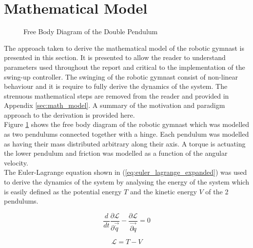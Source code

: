 \section{Mathematical Model}
\label{sec:mathematical_model}
\begin{figure}[h]
	\centering
	
	\caption{Free Body Diagram of the Double Pendulum}
	\label{fig:doublePen}
\end{figure}

The approach taken to derive the mathematical model of the robotic gymnast is presented in this section. It is presented to allow the reader to understand parameters used throughout the report and critical to the implementation of the swing-up controller. The swinging of the robotic gymnast consist of non-linear behaviour and it is  require to fully derive the dynamics of the system. The strenuous mathematical steps are removed from the reader and provided in Appendix \ref{sec:math_model}. A summary of the motivation and paradigm approach to the derivation is provided here.\\

 Figure \ref{fig:doublePen} shows the free body diagram of the robotic gymnast which was modelled as two pendulums connected together with a hinge. Each pendulum was modelled as having their mass distributed arbitrary along their axis. A torque is actuating the lower pendulum and friction was modelled as a function of the angular velocity.\\

The Euler-Lagrange equation shown in (\ref{eq:euler_lagrange_expanded}) was used to derive the dynamics of the system by analysing the energy of the system which is easily defined as the potential energy $T$ and the kinetic energy $V$ of the 2 pendulums.
 
\begin{equation} \label{eq:euler_lagrange_expanded}
\frac{d}{dt}\frac{\partial\mathcal{L}}{\partial\vec{\dot{q}}}-\frac{\partial\mathcal{L}}{ \vec{\partial q}} = 0
\end{equation}

\begin{equation} \label{eq:euler_lagrane}
\mathcal{L}=T-V
\end{equation}

